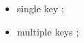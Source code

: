 \begin{itemize}
	\item single key \cite{vaswani2017attention};
	\item multiple keys \cite{ATLAS:2012yve,Witten:1998qj};
\end{itemize}